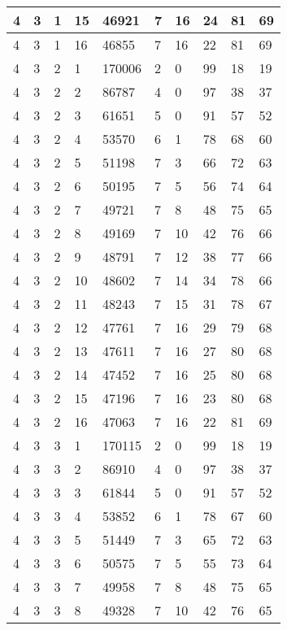 \begin{table}[!ht]
\begin{tabular}{|l|l|l|l|l|l|l|l|l|l|}
        4 & 3 & 1 & 15 & 46921 & 7 & 16 & 24 & 81 & 69 \\ \hline
        4 & 3 & 1 & 16 & 46855 & 7 & 16 & 22 & 81 & 69 \\ \hline
        4 & 3 & 2 & 1 & 170006 & 2 & 0 & 99 & 18 & 19 \\ \hline
        4 & 3 & 2 & 2 & 86787 & 4 & 0 & 97 & 38 & 37 \\ \hline
        4 & 3 & 2 & 3 & 61651 & 5 & 0 & 91 & 57 & 52 \\ \hline
        4 & 3 & 2 & 4 & 53570 & 6 & 1 & 78 & 68 & 60 \\ \hline
        4 & 3 & 2 & 5 & 51198 & 7 & 3 & 66 & 72 & 63 \\ \hline
        4 & 3 & 2 & 6 & 50195 & 7 & 5 & 56 & 74 & 64 \\ \hline
        4 & 3 & 2 & 7 & 49721 & 7 & 8 & 48 & 75 & 65 \\ \hline
        4 & 3 & 2 & 8 & 49169 & 7 & 10 & 42 & 76 & 66 \\ \hline
        4 & 3 & 2 & 9 & 48791 & 7 & 12 & 38 & 77 & 66 \\ \hline
        4 & 3 & 2 & 10 & 48602 & 7 & 14 & 34 & 78 & 66 \\ \hline
        4 & 3 & 2 & 11 & 48243 & 7 & 15 & 31 & 78 & 67 \\ \hline
        4 & 3 & 2 & 12 & 47761 & 7 & 16 & 29 & 79 & 68 \\ \hline
        4 & 3 & 2 & 13 & 47611 & 7 & 16 & 27 & 80 & 68 \\ \hline
        4 & 3 & 2 & 14 & 47452 & 7 & 16 & 25 & 80 & 68 \\ \hline
        4 & 3 & 2 & 15 & 47196 & 7 & 16 & 23 & 80 & 68 \\ \hline
        4 & 3 & 2 & 16 & 47063 & 7 & 16 & 22 & 81 & 69 \\ \hline
        4 & 3 & 3 & 1 & 170115 & 2 & 0 & 99 & 18 & 19 \\ \hline
        4 & 3 & 3 & 2 & 86910 & 4 & 0 & 97 & 38 & 37 \\ \hline
        4 & 3 & 3 & 3 & 61844 & 5 & 0 & 91 & 57 & 52 \\ \hline
        4 & 3 & 3 & 4 & 53852 & 6 & 1 & 78 & 67 & 60 \\ \hline
        4 & 3 & 3 & 5 & 51449 & 7 & 3 & 65 & 72 & 63 \\ \hline
        4 & 3 & 3 & 6 & 50575 & 7 & 5 & 55 & 73 & 64 \\ \hline
        4 & 3 & 3 & 7 & 49958 & 7 & 8 & 48 & 75 & 65 \\ \hline
        4 & 3 & 3 & 8 & 49328 & 7 & 10 & 42 & 76 & 65 \\ \hline

\end{tabular}
\end{table}
